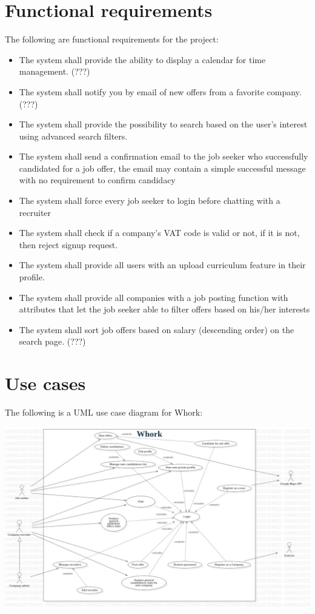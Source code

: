 \documentclass[12pt, a4paper]{article}
\begin{document}
\section{Functional requirements}
The following are functional requirements for the project:
\begin{itemize}
	\item The system shall provide the ability to display a calendar for time management. (???)
	\item The system shall notify you by email of new offers from a favorite company. (???)
	\item The system shall provide the possibility to search based on the user's interest using advanced search filters.
	\item The system shall send a confirmation email to the job seeker who successfully candidated for a job offer, the email may contain a simple successful message with no requirement to confirm candidacy
	\item The system shall force every job seeker to login before chatting with a recruiter
	\item The system shall check if a company's VAT code is valid or not, if it is not, then reject signup request.
	\item The system shall provide all users with an upload curriculum feature in their profile.
	\item The system shall provide all companies with a job posting function with attributes that let the job seeker 
	able to filter offers based on his/her interests
	\item The system shall sort job offers based on salary (descending order) on the search page. (???)
\end{itemize}

\newpage
\section{Use cases}
The following is a UML use case diagram for Whork:

\begin{center}
	\includegraphics[scale=1.7]{diagrams/project/usecase/usecase_scaled.jpg}
\end{center}
\end{document}
